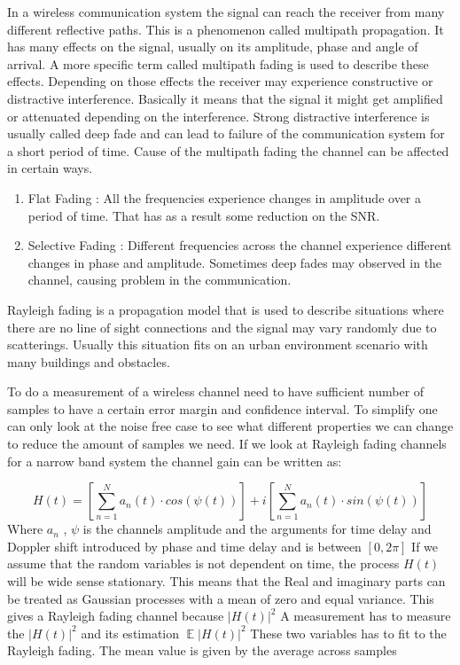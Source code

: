 In a wireless communication system the signal can reach the receiver from many different reflective paths. This is a phenomenon called multipath propagation. It has many effects on the signal, usually on its amplitude, phase and angle of arrival.\citep{Fading} A more specific term called multipath fading is used to describe these effects. Depending on those effects the receiver may experience constructive or distractive interference. Basically it means that the signal it might get amplified or attenuated depending on the interference. Strong distractive interference is usually called deep fade and can lead to failure of the communication system for a short period of time. Cause of the multipath fading the channel can be affected in certain ways.
	\begin{enumerate}
	\item Flat Fading : All the frequencies experience changes in amplitude over a period of time. That has as a result some reduction on the SNR.
	\item Selective Fading : Different frequencies across the channel experience different changes in phase and amplitude. Sometimes deep fades may observed in the channel, causing problem in the communication.\citep{FlatSelective}
	\end{enumerate}
Rayleigh fading is a propagation model that is used to describe situations where there are no line of sight connections and the signal may vary randomly due to scatterings. Usually this situation fits on an urban environment scenario with many buildings and obstacles.

To do a measurement of a wireless channel need to have sufficient number of samples to have a certain error margin and confidence interval. To simplify one can only look at  the noise free case to see what different properties we can change to reduce the amount of samples we need. 
If we look at Rayleigh fading channels for a narrow band system the channel gain can be written as:

\begin{equation}
H(t) = \left [ \sum_{n =1}^{N} a_n(t)\cdot cos(\psi (t))\right ] + i\left [\sum_{n =1}^{N} a_n(t)\cdot sin(\psi (t))  \right ]
\end{equation}
Where $a_n$ , $\psi$ is the channels amplitude and the arguments for time delay and Doppler shift introduced by phase and time delay and is between $[0,2\pi]$
If we assume that the random variables is not dependent on time, the process $H(t)$ will be wide sense stationary. This means that the Real and imaginary parts can be treated as Gaussian processes with a mean of zero and equal variance. This gives a Rayleigh fading channel because $ \left | H(t) \right |^2 $
A measurement has to measure the $ \left | H(t) \right |^2 $ and its estimation $ \mathop{\mathbb{E}}\left | H(t) \right |^2 $
These two variables has to fit to the Rayleigh fading. The mean value is given by the average across samples





